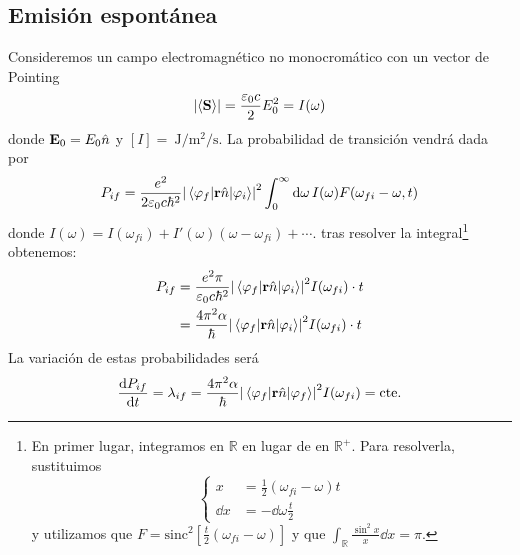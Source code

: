 \subsection{Emisión espontánea}
Consideremos un campo electromagnético no monocromático con un vector
de Pointing
\begin{equation}
  \abs{\ev{\boldrm{S}}} = \frac{\varepsilon_0c}{2} E_0^2 = I(\omega)
\end{equation}
donde $\bm{\mathrm{E}}_0 = E_0 \hat{n}$ y $[I] =
\SI{}{\joule\per\square\metre\per\second}$. La probabilidad de transición
vendrá dada por
\begin{equation}
  P_{if} = \frac{e^2}{2\varepsilon_0 c \hbar^2}
  \abs{\mel{\varphi_f}{\bm{\mathrm{r}}\hat{n}}{\varphi_i}}^2 \int_0^\infty
  \dd{\omega} I(\omega) F(\omega_{fi}-\omega,t)
\end{equation}
donde
$I(\omega)=I(\omega_{fi})+I'(\omega)(\omega-\omega_{fi})+\cdots$. tras
resolver la
integral\footnote{
En primer lugar, integramos en $\mathbb{R}$ en lugar de en
$\mathbb{R}^+$. Para resolverla, sustituimos
\begin{equation*}
  \begin{cases}
    x &= \frac{1}{2} (\omega_{fi}-\omega) t\\
    \dd{x} &= - \dd{\omega} \frac{t}{2}
  \end{cases}
\end{equation*}
y utilizamos que $F= \text{sinc}^2[\frac{t}{2}(\omega_{fi}-\omega)]$ y
que $\int_\mathbb{R} \frac{\sin^2 x}{x} \dd{x} = \pi$.
} obtenemos:
\begin{equation}
  \begin{split}
    P_{if} &= \frac{e^2\pi}{\varepsilon_0 c \hbar^2}
    \abs{\mel{\varphi_f}{\bm{\mathrm{r}}\hat{n}}{\varphi_i}}^2 I(\omega_{fi}) \cdot t\\
     &= \frac{4\pi^2\alpha}{\hbar}
    \abs{\mel{\varphi_f}{\bm{\mathrm{r}}\hat{n}}{\varphi_i}}^2 I(\omega_{fi})\cdot t
  \end{split}
\end{equation}
La variación de estas probabilidades será
\begin{equation}
  \dv{P_{if}}{t} =  \lambda_{if} =
  \frac{4\pi^2\alpha}{\hbar}
  \abs{\mel{\varphi_f}{\bm{\mathrm{r}}\hat{n}}{\varphi_f}}^2 I(\omega_{fi}) = \text{cte.}
\end{equation}



